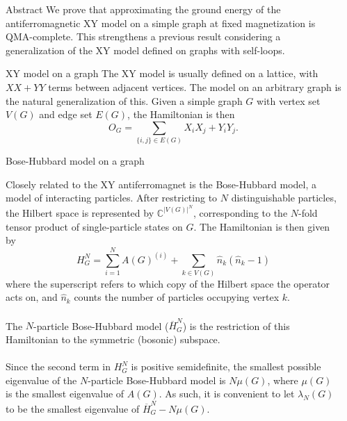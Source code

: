 \documentclass{beamer}
\newlength{\sepwid}
\newlength{\onecolwid}
\newcommand{\CC}{\mathbb{C}}
\begin{document}
\begin{frame}[t]
\begin{columns}[t]
\begin{column}{\sepwid}\end{column}

\begin{column}{\onecolwid}
  \begin{alertblock}{Abstract}
    We prove that approximating the ground energy of the antiferromagnetic XY model on a simple graph at fixed magnetization is QMA-complete.  This strengthens a previous result considering a generalization of the XY model defined on graphs with self-loops.
  \end{alertblock}
  
  \begin{block}{XY model on a graph}
    The XY model is usually defined on a lattice, with $XX + YY$ terms between adjacent vertices.  The model on an arbitrary graph is the natural generalization of this.  Given a simple graph $G$ with vertex set $V(G)$ and edge set $E(G)$, the Hamiltonian is then
    \[
      O_G = \sum_{\{i,j\}\in E(G)} X_i X_j + Y_i Y_j.
    \]
  \end{block}
  
  \begin{block}{Bose-Hubbard model on a graph}
  
  Closely related to the XY antiferromagnet is the Bose-Hubbard model, a model of interacting particles.  After restricting to $N$ distinguishable particles, the Hilbert space is represented by $\CC^{|V(G)|^N}$, corresponding to the $N$-fold tensor product of single-particle states on $G$.  The Hamiltonian is then given by
  \[
    H_G^N = \sum_{i=1}^N A(G)^{(i)} + \sum_{k\in V(G)} \hat{n}_k (\hat{n}_k - 1)
  \]
where the superscript refers to which copy of the Hilbert space the operator acts on, and $\hat{n}_k$ counts the number of particles occupying vertex $k$.
\\~\\
  The $N$-particle Bose-Hubbard model ($\overline{H}_G^N$) is the restriction of this Hamiltonian to the symmetric (bosonic) subspace.
  \\~\\
  Since the second term in $H_G^N$ is positive semidefinite, the smallest possible eigenvalue of the $N$-particle Bose-Hubbard model is $N \mu(G)$, where $\mu(G)$ is the smallest eigenvalue of $A(G)$.  As such, it is convenient to let $\lambda_{N}(G)$ to be the smallest eigenvalue of $\overline{H}_G^N - N \mu(G)$.
  \end{block}
\end{column}


\end{columns}
\end{frame}
\end{document}
